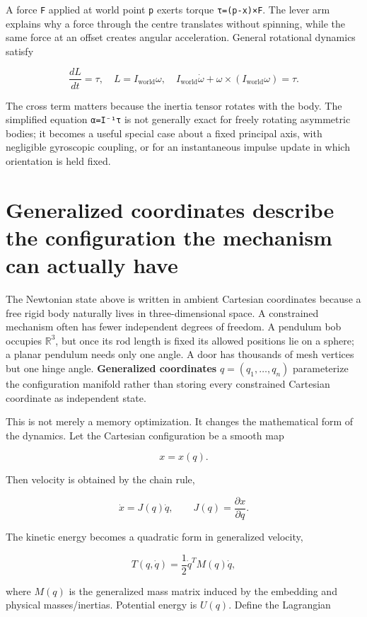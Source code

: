A force \texttt{F} applied at world point \texttt{p} exerts torque \texttt{τ=(p-x)×F}. The lever arm explains why a force through the centre translates without spinning, while the same force at an offset creates angular acceleration. General rotational dynamics satisfy

\[
\frac{dL}{dt}=\tau,\quad L=I_{\mathrm{world}}\omega,\quad
I_{\mathrm{world}}\dot\omega+\omega\times(I_{\mathrm{world}}\omega)=\tau .
\]

The cross term matters because the inertia tensor rotates with the body. The simplified equation \texttt{α=I⁻¹τ} is not generally exact for freely rotating asymmetric bodies; it becomes a useful special case about a fixed principal axis, with negligible gyroscopic coupling, or for an instantaneous impulse update in which orientation is held fixed.

\section{Generalized coordinates describe the configuration the mechanism can actually have}\label{02-foundations-ii-ch039-generalized-coordinates-describe-the-configuration-the-mechanism-can-actually-have}

The Newtonian state above is written in ambient Cartesian coordinates because a free rigid body naturally lives in three-dimensional space. A constrained mechanism often has fewer independent degrees of freedom. A pendulum bob occupies \(\mathbb R^3\), but once its rod length is fixed its allowed positions lie on a sphere; a planar pendulum needs only one angle. A door has thousands of mesh vertices but one hinge angle. \textbf{Generalized coordinates} \(q=(q_1,\ldots,q_n)\) parameterize the configuration manifold rather than storing every constrained Cartesian coordinate as independent state.

This is not merely a memory optimization. It changes the mathematical form of the dynamics. Let the Cartesian configuration be a smooth map

\[
x=x(q).
\]

Then velocity is obtained by the chain rule,

\[
\dot x
=
J(q)\dot q,
\qquad
J(q)=\frac{\partial x}{\partial q}.
\]

The kinetic energy becomes a quadratic form in generalized velocity,

\[
T(q,\dot q)
=
\frac12
\dot q^T M(q)\dot q,
\]

where \(M(q)\) is the generalized mass matrix induced by the embedding and physical masses/inertias. Potential energy is \(U(q)\). Define the Lagrangian

